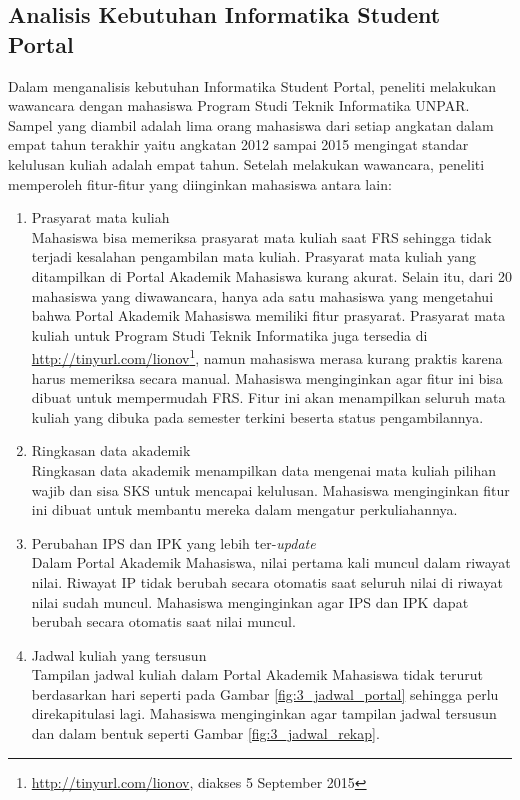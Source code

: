 \subsection{Analisis Kebutuhan Informatika Student Portal}
\label{sec:kebutuhan}
Dalam menganalisis kebutuhan Informatika Student Portal, peneliti melakukan wawancara dengan mahasiswa Program Studi Teknik Informatika UNPAR. Sampel yang diambil adalah lima orang mahasiswa dari setiap angkatan dalam empat tahun terakhir yaitu angkatan 2012 sampai 2015 mengingat standar kelulusan kuliah adalah empat tahun.
 Setelah melakukan wawancara, peneliti memperoleh fitur-fitur yang diinginkan mahasiswa antara lain:
\begin{enumerate}
	\item Prasyarat mata kuliah\\
	Mahasiswa bisa memeriksa prasyarat mata kuliah saat FRS sehingga tidak terjadi kesalahan pengambilan mata kuliah. Prasyarat mata kuliah yang ditampilkan di Portal Akademik Mahasiswa kurang akurat. Selain itu, dari 20 mahasiswa yang diwawancara, hanya ada satu mahasiswa yang mengetahui bahwa Portal Akademik Mahasiswa memiliki fitur prasyarat. Prasyarat mata kuliah untuk Program Studi Teknik Informatika juga tersedia di \url{http://tinyurl.com/lionov}\footnote{\url{http://tinyurl.com/lionov}, diakses 5 September 2015}, namun mahasiswa merasa kurang praktis karena harus memeriksa secara manual. Mahasiswa menginginkan agar fitur ini bisa dibuat untuk mempermudah FRS. Fitur ini akan menampilkan seluruh mata kuliah yang dibuka pada semester terkini beserta status pengambilannya.
	\item Ringkasan data akademik\\
	Ringkasan data akademik menampilkan data mengenai mata kuliah pilihan wajib dan sisa SKS untuk mencapai kelulusan. Mahasiswa menginginkan fitur ini dibuat untuk membantu mereka dalam mengatur perkuliahannya.
	\item Perubahan IPS dan IPK yang lebih ter-\textit{update}\\
	Dalam Portal Akademik Mahasiswa, nilai pertama kali muncul dalam riwayat nilai. Riwayat IP tidak berubah secara otomatis saat seluruh nilai di riwayat nilai sudah muncul. Mahasiswa menginginkan agar IPS dan IPK dapat berubah secara otomatis saat nilai muncul.
	\item Jadwal kuliah yang tersusun\\
	Tampilan jadwal kuliah dalam Portal Akademik Mahasiswa tidak terurut berdasarkan hari seperti pada Gambar \ref{fig:3_jadwal_portal} sehingga perlu direkapitulasi lagi. Mahasiswa menginginkan agar tampilan jadwal tersusun dan dalam bentuk seperti Gambar \ref{fig:3_jadwal_rekap}.

\end{enumerate}
